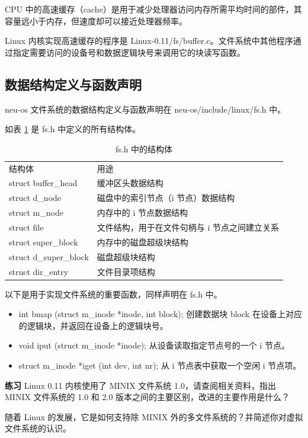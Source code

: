 CPU 中的高速缓存（cache）是用于减少处理器访问内存所需平均时间的部件，其容量远小于内存，但速度却可以接近处理器频率。

Linux 内核实现高速缓存的程序是 Linux-0.11/fs/buffer.c。文件系统中其他程序通过指定需要访问的设备号和数据逻辑块号来调用它的块读写函数。

\subsection{数据结构定义与函数声明}

neu-os 文件系统的数据结构定义与函数声明在 neu-os/include/linux/fs.h 中。

如表 \ref{tab:fs结构体} 是 fs.h 中定义的所有结构体。

\begin{table}[]
\caption{fs.h 中的结构体}
\label{tab:fs结构体}
\begin{tabular}{ll}
结构体 & 用途 \\
struct buffer\_head & 缓冲区头数据结构 \\
struct d\_node & 磁盘中的索引节点（i 节点）数据结构 \\
struct m\_node & 内存中的 i 节点数据结构 \\
struct file & 文件结构，用于在文件句柄与 i 节点之间建立关系 \\
struct super\_block & 内存中的磁盘超级块结构 \\
struct d\_super\_block & 磁盘超级块结构 \\
struct dir\_entry & 文件目录项结构
\end{tabular}
\end{table}

以下是用于实现文件系统的重要函数，同样声明在 fs.h 中。

\begin{itemize}
    \item int bmap (struct m\_inode *inode, int block); 创建数据块 block 在设备上对应的逻辑块，并返回在设备上的逻辑块号。
    \item void iput (struct m\_inode *inode); 从设备读取指定节点号的一个 i 节点。
    \item struct m\_inode *iget (int dev, int nr); 从 i 节点表中获取一个空闲 i 节点项。
    
\end{itemize}

\begin{mdframed}[hidealllines=true,backgroundcolor=gray!20]
\textbf{练习 }Linux 0.11 内核使用了 MINIX 文件系统 1.0，请查阅相关资料，指出 MINIX 文件系统的 1.0 和 2.0 版本之间的主要区别，改进的主要作用是什么？

随着 Linux 的发展，它是如何支持除 MINIX 外的多文件系统的？并简述你对虚拟文件系统的认识。
\end{mdframed}

